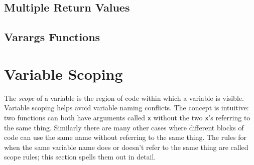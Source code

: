 \documentclass{article}
\renewcommand{\sec}[1]{\label{sec:#1}}
\begin{document}
\subsection{Multiple Return Values}
\subsection{Varargs Functions}

\section{Variable Scoping}\sec{variable-scoping}

The \emph{scope} of a variable is the region of code within which a variable
is visible.
Variable scoping helps avoid variable naming conflicts.
The concept is intuitive:
two functions can both have arguments called \verb|x| without the two \verb|x|'s referring to the same thing.
Similarly there are many other cases where different blocks of code can use the same name without referring to the same thing.
The rules for when the same variable name does or doesn't refer to the same thing are called scope rules;
this section spells them out in detail.
\end{document}
